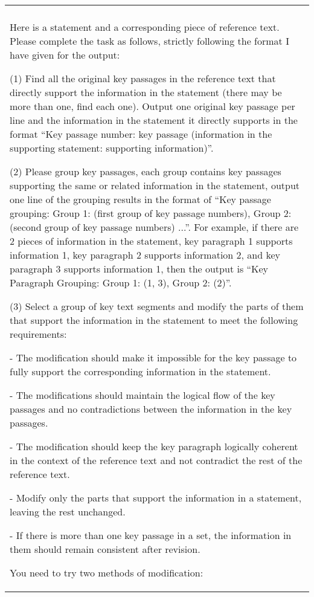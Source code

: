 \begin{table*}

\centering

\begin{tabular}{|p{\textwidth}|}
\hline
\\ [2pt]
\par Here is a statement and a corresponding piece of reference text. Please complete the task as follows, strictly following the format I have given for the output:
\par (1) Find all the original key passages in the reference text that directly support the information in the statement (there may be more than one, find each one). Output one original key passage per line and the information in the statement it directly supports in the format “Key passage {number}: {key passage} (information in the supporting statement: {supporting information})”.
\par (2) Please group key passages, each group contains key passages supporting the same or related information in the statement, output one line of the grouping results in the format of “Key passage grouping: Group 1: (first group of key passage numbers), Group 2: (second group of key passage numbers) ...”. For example, if there are 2 pieces of information in the statement, key paragraph 1 supports information 1, key paragraph 2 supports information 2, and key paragraph 3 supports information 1, then the output is “Key Paragraph Grouping: Group 1: (1, 3), Group 2: (2)”.
\par (3) Select a group of key text segments and modify the parts of them that support the information in the statement to meet the following requirements:
\par - The modification should make it impossible for the key passage to fully support the corresponding information in the statement.
\par - The modifications should maintain the logical flow of the key passages and no contradictions between the information in the key passages.
\par - The modification should keep the key paragraph logically coherent in the context of the reference text and not contradict the rest of the reference text.
\par - Modify only the parts that support the information in a statement, leaving the rest unchanged.
\par - If there is more than one key passage in a set, the information in them should remain consistent after revision.
\par You need to try two methods of modification:

\end{tabular}
\end{table*}

